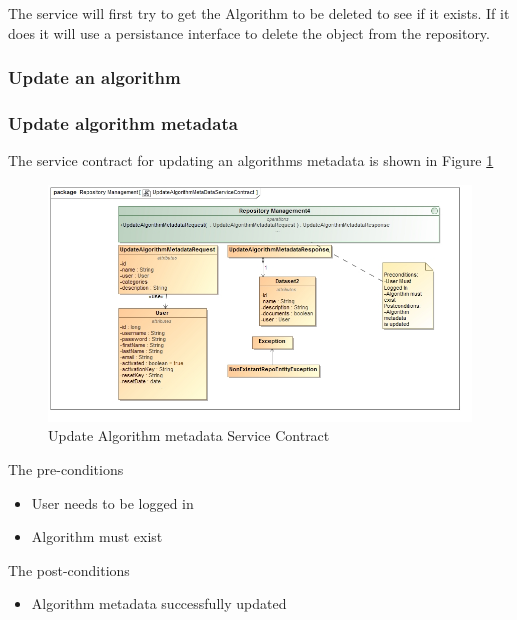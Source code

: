  The service will first try to get the Algorithm to be deleted to see if it
 exists. If it does it will use a persistance interface to delete the object
 from the repository.

\subsubsection {Update an algorithm}

\subsubsection {Update algorithm metadata}
The service contract for updating an algorithms metadata is shown in Figure \ref{fig:updateAlgorithmMetadataServiceContract}
\begin{figure}[H]
	\begin{center}
	\includegraphics[scale=0.6]{../Diagrams and Charts/Test Data/UpdateAlgorithmMetaDataServiceContract.jpg}
		\caption{Update Algorithm metadata Service Contract}
		\label{fig:updateAlgorithmMetadataServiceContract}
	\end{center}	
\end{figure}

The pre-conditions
\begin{itemize}
	\item User needs to be logged in
	\item Algorithm must exist
\end{itemize}

The post-conditions
\begin{itemize}
	\item Algorithm metadata successfully updated
\end{itemize}
